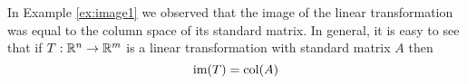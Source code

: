 \documentclass{ximera}
\begin{document}
\begin{general}
In Example \ref{ex:image1} we observed that the image of the linear transformation was equal to the column space of its standard matrix.  In general, it is easy to see that if $T:\mathbb{R}^n\rightarrow \mathbb{R}^m$ is a linear transformation with standard matrix $A$ then
$$\textnormal{im}(T)=\textnormal{col}(A)$$





\end{general}
\end{document}
